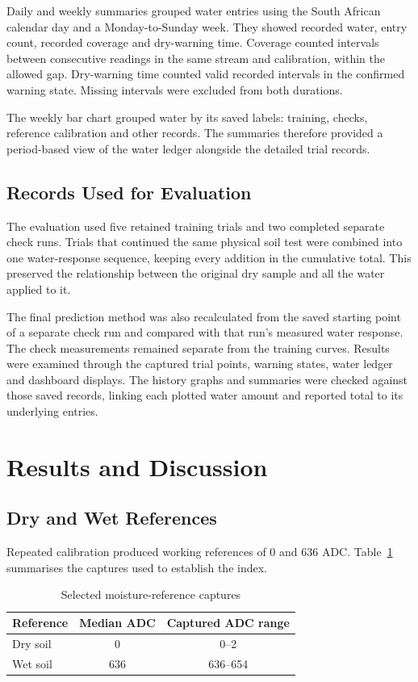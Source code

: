 \documentclass[11pt,a4paper]{article}
\begin{document}
Daily and weekly summaries grouped water entries using the South African calendar day and a Monday-to-Sunday week. They showed recorded water, entry count, recorded coverage and dry-warning time. Coverage counted intervals between consecutive readings in the same stream and calibration, within the allowed gap. Dry-warning time counted valid recorded intervals in the confirmed warning state. Missing intervals were excluded from both durations.

The weekly bar chart grouped water by its saved labels: training, checks, reference calibration and other records. The summaries therefore provided a period-based view of the water ledger alongside the detailed trial records.

\subsection{Records Used for Evaluation}

The evaluation used five retained training trials and two completed separate check runs. Trials that continued the same physical soil test were combined into one water-response sequence, keeping every addition in the cumulative total. This preserved the relationship between the original dry sample and all the water applied to it.

The final prediction method was also recalculated from the saved starting point of a separate check run and compared with that run's measured water response. The check measurements remained separate from the training curves. Results were examined through the captured trial points, warning states, water ledger and dashboard displays. The history graphs and summaries were checked against those saved records, linking each plotted water amount and reported total to its underlying entries.

\section{Results and Discussion}

\subsection{Dry and Wet References}

Repeated calibration produced working references of 0 and 636 ADC. Table~\ref{tab:calibration} summarises the captures used to establish the index.

\begin{table}[htbp]
\centering
\caption{Selected moisture-reference captures}
\label{tab:calibration}
\begin{tabular}{|l|c|c|}
\hline
\textbf{Reference} & \textbf{Median ADC} & \textbf{Captured ADC range} \\ \hline
Dry soil & 0 & 0--2 \\ \hline
Wet soil & 636 & 636--654 \\ \hline
\end{tabular}
\end{table}
\end{document}
